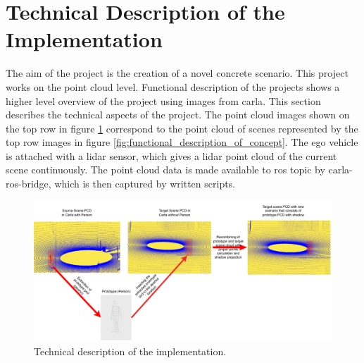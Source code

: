 \section{Technical Description of the Implementation}
The aim of the project is the creation of a novel concrete scenario. This project works on the point cloud level. Functional description of the projects shows a higher level overview of the project using images from \acrshort{carla}. This section describes the technical aspects of the project. The point cloud images shown on the top row in figure \ref{fig:technical_description_of_implementation} correspond to the point cloud of scenes represented by the top row images in figure \ref{fig:functional_description_of_concept}. The ego vehicle is attached with a lidar sensor, which gives a lidar point cloud of the current scene continuously. The point cloud data is made available to \acrfull{ros} topic by carla-ros-bridge, which is then captured by written scripts. 

\begin{figure}[htbp]
    \centering
    \includegraphics[width=1\linewidth]{97_graphics/concepts/technical_description_of_concept.pdf}
    \caption{Technical description of the implementation.}
    \label{fig:technical_description_of_implementation}
\end{figure}

